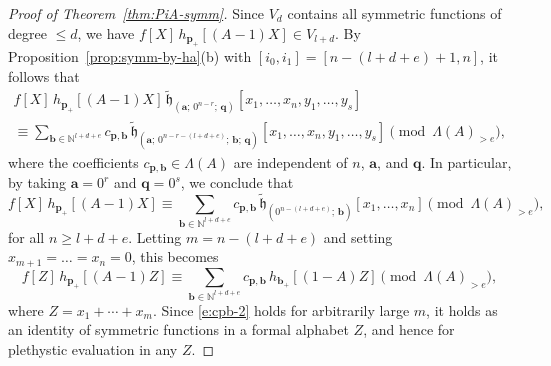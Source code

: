 \documentclass[12pt]{amsart}
\theoremstyle{definition}
\theoremstyle{remark}
\newcommand{\NN}{{\mathbb N}}
\newcommand{\aA}{{\mathbf a}}
\newcommand{\bb}{{\mathbf b}}
\newcommand{\pp}{{\mathbf p}}
\newcommand{\qq}{{\mathbf q}}
\newcommand{\tfh}{{\widetilde{\mathfrak h}}}
\begin{document}
\begin{proof}[Proof of Theorem~\ref{thm:PiA-symm}]
Since $V_{d}$ contains all symmetric
functions of degree $\leq d$, we have $f[X]\, h_{\pp _{+}}[(A-1)X] \in
V_{l+d}$.  By Proposition~\ref{prop:symm-by-ha}(b) with
$[i_{0},i_{1}]= [n-(l+d+e)+1,n]$, it follows that
\begin{multline}\label{e:p-term}
f[X]\, h_{\pp _{+}}[(A-1)X]\, \tfh_{(\aA ;\, 0^{n-r};\, \qq)
}[x_{1}, \ldots, x_{n}, y_{1}, \ldots, y_{s}]\\
\equiv \sum _{\bb \in \NN ^{l+d+e}} c_{\pp ,\bb }\, \tfh_{(\aA ;\,
0^{n-r-(l+d+e)};\, \bb ;\, \qq )} [x_{1}, \ldots, x_{n}, y_{1},
\ldots, y_{s}] \pmod{\Lambda (A)_{>e}},
\end{multline}
where the coefficients $c_{\pp ,\bb }\in \Lambda (A)$ are independent
of $n$, $\aA $, and $\qq $.  In particular, by taking $\aA = 0^{r}$
and $\qq = 0^{s}$, we conclude that
\begin{equation}\label{e:cpb-1}
f[X]\, h_{\pp _{+}}[(A-1)X] \equiv \sum _{\bb \in \NN ^{l+d+e}} c_{\pp
,\bb }\, \tfh_{( 0^{n-(l+d+e)};\, \bb )} [x_{1}, \ldots, x_{n}]
\pmod{\Lambda (A)_{>e}},
\end{equation}
for all $n\geq l+d+e$.  Letting $m=n-(l+d+e)$ and setting $x_{m+1} =
\ldots = x_{n} = 0$, this becomes
\begin{equation}\label{e:cpb-2}
f[Z]\, h_{\pp _{+}}[(A-1)Z] \equiv \sum _{\bb \in \NN ^{l+d+e}} c_{\pp
,\bb }\, h _{\bb _{+}} [(1-A)Z] \pmod{\Lambda (A)_{>e}},
\end{equation}
where $Z = x_{1}+\cdots +x_{m}$.  Since \eqref{e:cpb-2} holds for
arbitrarily large $m$, it holds as an identity of symmetric functions
in a formal alphabet $Z$, and hence for plethystic evaluation in any
$Z$.


\end{proof}
\end{document}
